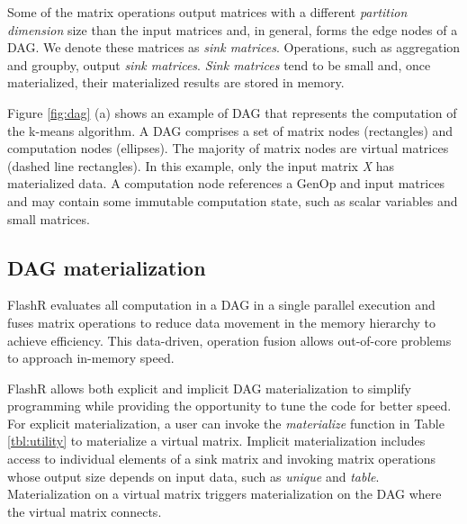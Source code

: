 
Some of the matrix operations output matrices with
a different \textit{partition dimension} size than the input matrices and,
in general, forms the edge nodes of a DAG. We denote these matrices as
\textit{sink matrices}. Operations, such as aggregation and groupby,
output \textit{sink matrices}. \textit{Sink matrices} tend to be small and, once
materialized, their materialized results are stored in memory.

Figure \ref{fig:dag} (a) shows an example of DAG that represents the computation
of the k-means algorithm. A DAG comprises a set of
matrix nodes (rectangles) and computation nodes (ellipses). The majority of
matrix nodes are virtual matrices (dashed line rectangles).
In this example, only the input matrix \textit{X} has materialized data.
A computation node references a GenOp and input matrices and
may contain some immutable computation state, such as scalar variables and
small matrices. 

\subsection{DAG materialization}\label{sec:materialize}
FlashR evaluates all computation in a DAG in a single parallel execution
and fuses matrix operations to reduce data
movement in the memory hierarchy to achieve efficiency. This data-driven,
operation fusion allows out-of-core problems to approach in-memory speed.

FlashR allows both explicit and implicit DAG materialization to simplify
programming while providing the opportunity to tune the code for
better speed. For explicit materialization, a user can invoke the
\textit{materialize} function in Table \ref{tbl:utility} to materialize
a virtual matrix. Implicit materialization includes access to individual
elements of a sink matrix and invoking matrix operations whose output size
depends on input data, such as \textit{unique} and \textit{table}. Materialization
on a virtual matrix triggers materialization on the DAG where the virtual
matrix connects.

